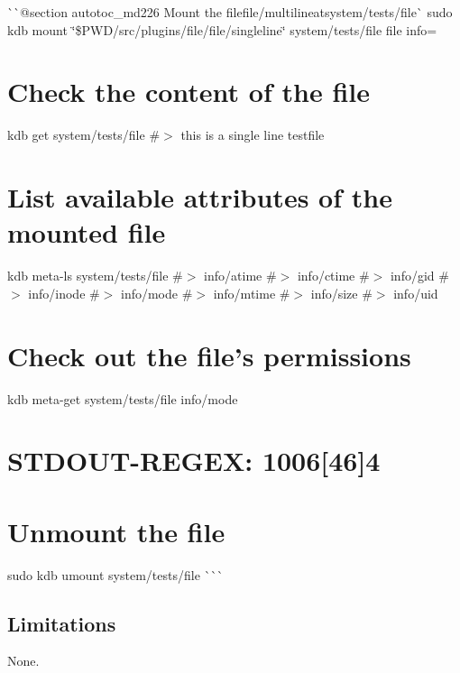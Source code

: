 \`{}\`{}{\ttfamily  @section autotoc\+\_\+md226 Mount the file}file/multiline{\ttfamily at}system/tests/file\`{} sudo kdb mount \char`\"{}\$\+P\+W\+D/src/plugins/file/file/singleline\char`\"{} system/tests/file file info=\hypertarget{autotoc_md221_autotoc_md227}{}\section{Check the content of the file}\label{autotoc_md221_autotoc_md227}
kdb get system/tests/file \#$>$ this is a single line testfile\hypertarget{autotoc_md221_autotoc_md228}{}\section{List available attributes of the mounted file}\label{autotoc_md221_autotoc_md228}
kdb meta-\/ls system/tests/file \#$>$ info/atime \#$>$ info/ctime \#$>$ info/gid \#$>$ info/inode \#$>$ info/mode \#$>$ info/mtime \#$>$ info/size \#$>$ info/uid\hypertarget{autotoc_md221_autotoc_md229}{}\section{Check out the file’s permissions}\label{autotoc_md221_autotoc_md229}
kdb meta-\/get system/tests/file info/mode \hypertarget{autotoc_md221_autotoc_md230}{}\section{S\+T\+D\+O\+U\+T-\/\+R\+E\+G\+E\+X\+: 1006\mbox{[}46\mbox{]}4}\label{autotoc_md221_autotoc_md230}
\hypertarget{autotoc_md221_autotoc_md231}{}\section{Unmount the file}\label{autotoc_md221_autotoc_md231}
sudo kdb umount system/tests/file \`{}\`{}\`{}\hypertarget{autotoc_md221_autotoc_md232}{}\subsection{Limitations}\label{autotoc_md221_autotoc_md232}
None. 
